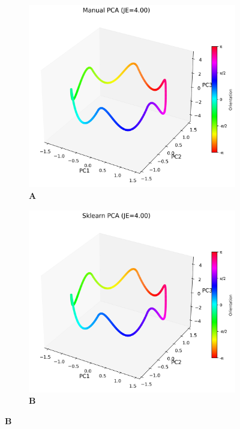 \documentclass[11pt,a4paper]{article}
\begin{document}
\begin{figure}[H]
\centering
\begin{subfigure}{0.45\textwidth}
    \centering
    \caption*{\textbf{A}}
    \includegraphics[width=\textwidth]{manual_pca.png}
\end{subfigure}
\hfill
\begin{subfigure}{0.45\textwidth}
    \centering
    \caption*{\textbf{B}}
    \includegraphics[width=\textwidth]{sklearn_pca.png}
\end{subfigure}


\end{figure}
\end{document}
